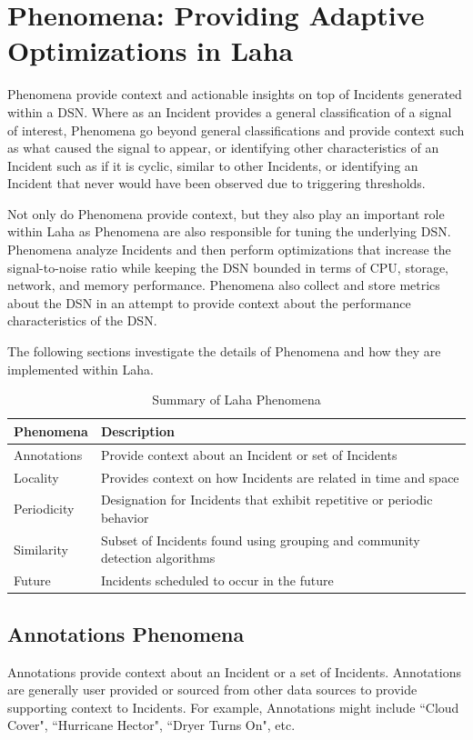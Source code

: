 \section{Phenomena: Providing Adaptive Optimizations in Laha}\label{sec:phenomena}

Phenomena provide context and actionable insights on top of Incidents generated within a DSN. Where as an Incident provides a general classification of a signal of interest, Phenomena go beyond general classifications and provide context such as what caused the signal to appear, or identifying other characteristics of an Incident such as if it is cyclic, similar to other Incidents, or identifying an Incident that never would have been observed due to triggering thresholds.

Not only do Phenomena provide context, but they also play an important role within Laha as Phenomena are also responsible for tuning the underlying DSN\@. Phenomena analyze Incidents and then perform optimizations that increase the signal-to-noise ratio while keeping the DSN bounded in terms of CPU, storage, network, and memory performance. Phenomena also collect and store metrics about the DSN in an attempt to provide context about the performance characteristics of the DSN\@.

The following sections investigate the details of Phenomena and how they are implemented within Laha.

\begin{table}[h]
	\centering
	\begin{tabularx}{\textwidth}{lX}
		\toprule
		\textbf{Phenomena} & \textbf{Description} \\
		\midrule
		Annotations & Provide context about an Incident or set of Incidents \\
		Locality & Provides context on how Incidents are related in time and space \\
		Periodicity & Designation for Incidents that exhibit repetitive or periodic behavior \\
		Similarity & Subset of Incidents found using grouping and community detection algorithms \\
		Future & Incidents scheduled to occur in the future\\
		\bottomrule
	\end{tabularx}
	\caption{Summary of Laha Phenomena}
	\label{phenomena-summary-table}
\end{table}

\subsection{Annotations Phenomena}\label{subsec:annotations-phenomena}
Annotations provide context about an Incident or a set of Incidents. Annotations are generally user provided or sourced from other data sources to provide supporting context to Incidents. For example, Annotations might include ``Cloud Cover", ``Hurricane Hector", ``Dryer Turns On", etc.

